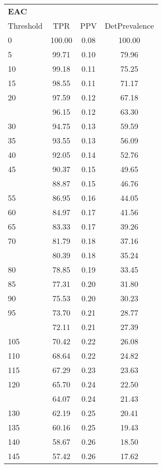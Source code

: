 \begin{table}[ht]
\centering\scriptsize
\begin{tabular}{lccc}
  \toprule
  \multicolumn{4}{l}{\textbf{EAC}}\\
Threshold & TPR & PPV & DetPrevalence \\ 
  \midrule
0 & 100.00 & 0.08 & 100.00 \\ 
  5 & 99.71 & 0.10 & 79.96 \\ 
  10 & 99.18 & 0.11 & 75.25 \\ 
  15 & 98.55 & 0.11 & 71.17 \\ 
  20 & 97.59 & 0.12 & 67.18 \\ 
   \addlinespace
25 & 96.15 & 0.12 & 63.30 \\ 
  30 & 94.75 & 0.13 & 59.59 \\ 
  35 & 93.55 & 0.13 & 56.09 \\ 
  40 & 92.05 & 0.14 & 52.76 \\ 
  45 & 90.37 & 0.15 & 49.65 \\ 
   \addlinespace
50 & 88.87 & 0.15 & 46.76 \\ 
  55 & 86.95 & 0.16 & 44.05 \\ 
  60 & 84.97 & 0.17 & 41.56 \\ 
  65 & 83.33 & 0.17 & 39.26 \\ 
  70 & 81.79 & 0.18 & 37.16 \\ 
   \addlinespace
75 & 80.39 & 0.18 & 35.24 \\ 
  80 & 78.85 & 0.19 & 33.45 \\ 
  85 & 77.31 & 0.20 & 31.80 \\ 
  90 & 75.53 & 0.20 & 30.23 \\ 
  95 & 73.70 & 0.21 & 28.77 \\ 
   \addlinespace
100 & 72.11 & 0.21 & 27.39 \\ 
  105 & 70.42 & 0.22 & 26.08 \\ 
  110 & 68.64 & 0.22 & 24.82 \\ 
  115 & 67.29 & 0.23 & 23.63 \\ 
  120 & 65.70 & 0.24 & 22.50 \\ 
   \addlinespace
125 & 64.07 & 0.24 & 21.43 \\ 
  130 & 62.19 & 0.25 & 20.41 \\ 
  135 & 60.16 & 0.25 & 19.43 \\ 
  140 & 58.67 & 0.26 & 18.50 \\ 
  145 & 57.42 & 0.26 & 17.62 \\ 

\end{tabular}
\end{table}
